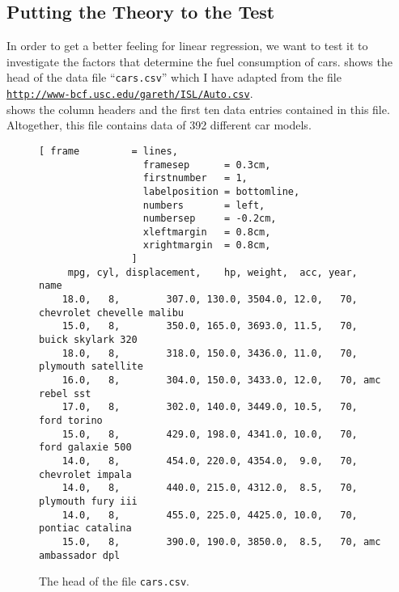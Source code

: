 \subsection{Putting the Theory to the Test}
In order to get a better feeling for linear regression, we want to test it to investigate the factors that
determine the fuel consumption of cars.   shows the head of the data file ``\texttt{cars.csv}''
which I have adapted from the file
\\[0.2cm]
\hspace*{1.3cm}
\href{http://www-bcf.usc.edu/~gareth/ISL/Auto.csv}{\texttt{http://www-bcf.usc.edu/gareth/ISL/Auto.csv}}.
\\[0.2cm]
 shows the column headers and the first ten data entries contained in this file.  
Altogether, this file contains data of 392 different car models.

\begin{figure}[!ht]
\centering
\begin{Verbatim}[ frame         = lines, 
                  framesep      = 0.3cm, 
                  firstnumber   = 1,
                  labelposition = bottomline,
                  numbers       = left,
                  numbersep     = -0.2cm,
                  xleftmargin   = 0.8cm,
                  xrightmargin  = 0.8cm,
                ]
     mpg, cyl, displacement,    hp, weight,  acc, year, name
    18.0,   8,        307.0, 130.0, 3504.0, 12.0,   70, chevrolet chevelle malibu
    15.0,   8,        350.0, 165.0, 3693.0, 11.5,   70, buick skylark 320
    18.0,   8,        318.0, 150.0, 3436.0, 11.0,   70, plymouth satellite
    16.0,   8,        304.0, 150.0, 3433.0, 12.0,   70, amc rebel sst
    17.0,   8,        302.0, 140.0, 3449.0, 10.5,   70, ford torino
    15.0,   8,        429.0, 198.0, 4341.0, 10.0,   70, ford galaxie 500
    14.0,   8,        454.0, 220.0, 4354.0,  9.0,   70, chevrolet impala
    14.0,   8,        440.0, 215.0, 4312.0,  8.5,   70, plymouth fury iii
    14.0,   8,        455.0, 225.0, 4425.0, 10.0,   70, pontiac catalina
    15.0,   8,        390.0, 190.0, 3850.0,  8.5,   70, amc ambassador dpl
\end{Verbatim}
\vspace*{-0.3cm}
\caption{The head of the file \texttt{cars.csv}.}
\label{fig:cars.csv}
\end{figure}

